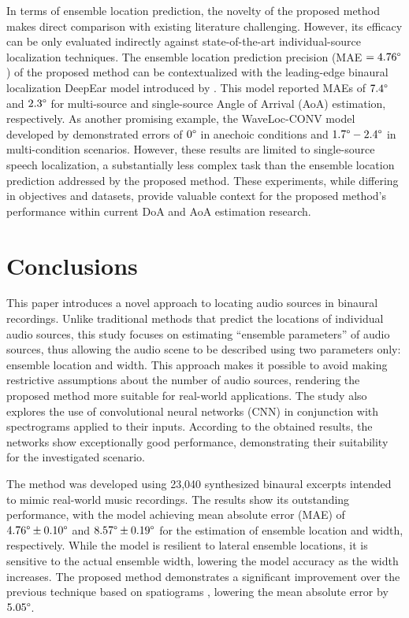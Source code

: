 \documentclass[11pt]{article}
\begin{document}
In terms of ensemble location prediction, the novelty of the proposed method makes direct comparison with existing literature challenging. However, its efficacy can be only evaluated indirectly against state-of-the-art individual-source localization techniques. The ensemble location prediction precision (MAE $=4.76\degree$) of the proposed method can be contextualized with the leading-edge binaural localization DeepEar model introduced by \textcite{yang_deepear_2022}. This model reported MAEs of $7.4\degree$ and $2.3\degree$ for multi-source and single-source Angle of Arrival (AoA) estimation, respectively. As another promising example, the WaveLoc-CONV model developed by \textcite{vecchiotti_end--end_2019} demonstrated errors of $0\degree$ in anechoic conditions and $1.7\degree-2.4\degree$ in multi-condition scenarios. However, these results are limited to single-source speech localization, a substantially less complex task than the ensemble location prediction addressed by the proposed method. These experiments, while differing in objectives and datasets, provide valuable context for the proposed method's performance within current DoA and AoA estimation research.

\section{Conclusions}
\label{sec:conclusions}

This paper introduces a novel approach to locating audio sources in binaural recordings. Unlike traditional methods that predict the locations of individual audio sources, this study focuses on estimating ``ensemble parameters'' of audio sources, thus allowing the audio scene to be described using two parameters only: ensemble location and width. This approach makes it possible to avoid making restrictive assumptions about the number of audio sources, rendering the proposed method more suitable for real-world applications. The study also explores the use of convolutional neural networks (CNN) in conjunction with spectrograms applied to their inputs. According to the obtained results, the networks show exceptionally good performance, demonstrating their suitability for the investigated scenario.

The method was developed using 23,040 synthesized binaural excerpts intended to mimic real-world music recordings. The results show its outstanding performance, with the model achieving mean absolute error (MAE) of $4.76\degree \pm 0.10\degree$ and $8.57\degree \pm 0.19\degree$ for the estimation of ensemble location and width, respectively. While the model is resilient to lateral ensemble locations, it is sensitive to the actual ensemble width, lowering the model accuracy as the width increases. The proposed method demonstrates a significant improvement over the previous technique based on spatiograms \parencite{antoniuk_blind_2023}, lowering the mean absolute error by $5.05\degree$.
\end{document}

